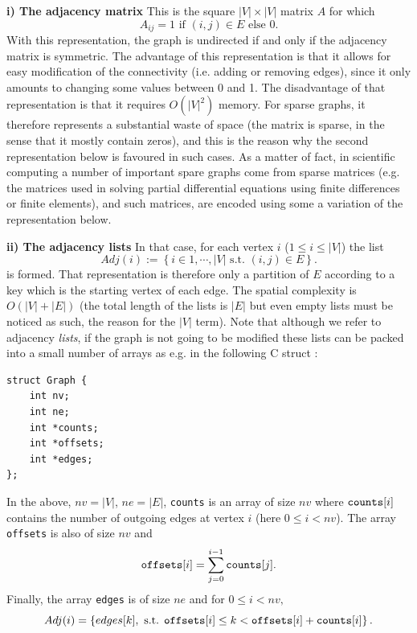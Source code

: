 \documentclass[12pt]{article}
\theoremstyle{plain}
\theoremstyle{remark}
\begin{document}
{\bf i) The adjacency matrix} This is the square $|V| \times |V|$ matrix $A$ for which
$$
A_{ij} = 1 \text{ if } (i,j) \in E \text{ else } 0.
$$
With this representation, the graph is undirected if and only if the adjacency
matrix is symmetric. The advantage of this representation is that it allows for
easy modification of the connectivity (i.e. adding or removing edges), since it
only amounts to changing some values between 0 and 1. The disadvantage of that 
representation is that it requires $O(|V|^2)$ memory. For sparse graphs, it
therefore represents a substantial waste of space (the matrix is sparse, in the
sense that it mostly contain zeros), and this is the reason why the second
representation below is favoured in such cases. As a matter of fact, in
scientific computing a number of important spare graphs come from sparse
matrices (e.g. the matrices used in solving partial differential equations using
finite differences or finite elements), and such matrices, are encoded using some 
a variation of the representation below.

\medskip

{\bf ii) The adjacency lists} In that case, for each vertex $i$ ($1 \leq i
\leq |V|$) the list
$$
Adj(i) := \left\{ i \in 1,\cdots, |V| \text{ s.t. } (i,j) \in E\right\}.
$$
is formed. That representation is therefore only a partition of $E$ according to
a key which is the starting vertex of each edge. The spatial complexity is 
$O(|V| + |E|)$ (the total length of the lists is $|E|$ but even empty lists
must be noticed as such, the reason for the $|V|$ term). Note that although
we refer to adjacency {\it lists}, if the graph is not going to be modified these 
lists can be packed into a small number of arrays as e.g. in the following C struct :

\begin{lstlisting}[style=C]
struct Graph {
	int nv;
	int ne;
	int *counts;
	int *offsets;
	int *edges;
};
\end{lstlisting}
In the above, $nv = |V|$, $ne=|E|$, {\tt counts} is an array of size $nv$ where
${\tt counts}[i]$ contains the number of outgoing edges at vertex $i$ (here $0 \leq i
< nv$). The array {\tt offsets} is also of size $nv$ and $${\tt offsets}[i] =
\sum_{j=0}^{i-1}{\tt counts}[j].$$ Finally, the array {\tt edges} is of size $ne$ and 
for $0 \leq i < nv,$
$$
Adj(i) = \left\{ edges[k],\text{ s.t. } {\tt offsets}[i] \leq k < {\tt offsets}[i] +
{\tt counts}[i]\right\}.
$$
\end{document}
